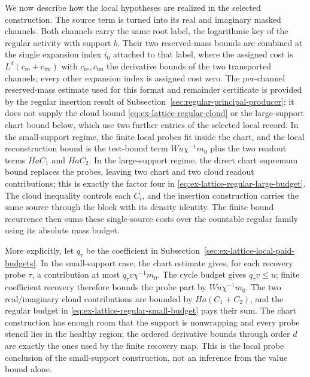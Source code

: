We now describe how the local hypotheses are realized in the selected
construction. The source term is
turned into its real and imaginary masked channels. Both channels carry the
same root label, the logarithmic key of the regular activity with support
\(b\). Their two reserved-mass bounds are combined at the single expansion
index \(i_0\) attached to that label, where the assigned cost is
\(L^d(c_{\mathrm{re}}+c_{\mathrm{im}})\) with \(c_{\mathrm{re}},
c_{\mathrm{im}}\) the derivative bounds of the two transported channels;
every other expansion index is
assigned cost zero. The per-channel reserved-mass estimate used for this
format and remainder certificate is
provided by the regular insertion result of
Subsection~\ref{sec:regular-principal-producer}; it does not supply the
cloud bound \eqref{eq:ex-lattice-regular-cloud} or the large-support chart
bound below, which use two further entries of the selected local record. In the small-support regime,
the finite local probes fit inside the chart, and the local reconstruction
bound is the test-bound term \(Wu\chi^{-1}m_0\) plus the two readout terms
\(HaC_1\) and \(HaC_2\). In the large-support regime, the direct chart
supremum bound replaces the probes, leaving two chart and two cloud
readout contributions; this is exactly the factor four in
\eqref{eq:ex-lattice-regular-large-budget}. The cloud inequality controls
each \(C_i\), and the insertion construction carries the same source
through the block with its density identity. The finite bound recurrence
then sums these single-source costs over the countable regular family using
its absolute mass budget.

More explicitly, let \(q_\tau\) be the coefficient in
Subsection~\ref{sec:ex-lattice-local-paid-budgets}. In the small-support case,
the chart estimate gives, for each recovery probe \(\tau\), a contribution
at most \(q_\tau v\chi^{-1}m_0\). The cycle budget gives
\(q_\tau v\leq u\); finite coefficient recovery therefore bounds the
probe part by \(Wu\chi^{-1}m_0\). The two real/imaginary cloud
contributions are bounded by
\(Ha(C_1+C_2)\), and the regular budget in
\eqref{eq:ex-lattice-regular-small-budget} pays their sum. The chart
construction has enough room that the support is nonwrapping and every
probe stencil lies in the healthy region; the ordered derivative bounds
through order \(d\) are exactly the ones used by the finite recovery map.
This is the local probe conclusion of the small-support construction, not an
inference from the value bound alone.

